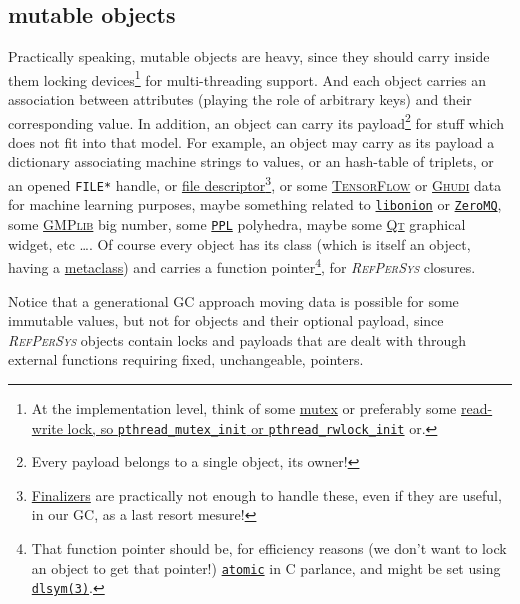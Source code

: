 \documentclass[11pt,a4paper,svgnames]{article}
\newcommand{\RefPerSys}{{\textit{\textsc{RefPerSys}}}}
\begin{document}
\subsection{mutable objects}
\label{subsec:mutable-objects}

Practically speaking, mutable objects are heavy, since they should
carry inside them locking devices\footnote{At the implementation
level, think of some
\href{https://computing.llnl.gov/tutorials/pthreads/\#Mutexes}{mutex}
or preferably some
\href{http://tuxthink.blogspot.com/2013/02/using-read-write-lock-in-pthreads.html}{read-write
  lock, so
  \href{https://pubs.opengroup.org/onlinepubs/7908799/xsh/pthread\_mutex\_init.html}{\texttt{pthread\_mutex\_init}}
  or
  \href{https://pubs.opengroup.org/onlinepubs/7908799/xsh/pthread_rwlock_init.html}{\texttt{pthread\_rwlock\_init}}}
or.} for multi-threading support. And each object carries
an association between attributes (playing the role of arbitrary keys)
and their corresponding value. In addition, an object can carry its
payload\footnote{Every payload belongs to a single object, its owner!}
for stuff which does not fit into that model. For example, an object
may carry as its payload a dictionary associating machine strings to
values, or an hash-table of triplets, or an opened \texttt{FILE*}
handle, or \href{https://en.wikipedia.org/wiki/File\_descriptor}{file
  descriptor}\footnote{\href{https://en.wikipedia.org/wiki/Finalizer}{Finalizers}
are practically not enough to handle these, even if they are useful,
in our GC, as a last resort mesure!}, or some
\href{https://www.tensorflow.org/}{\textsc{TensorFlow}} or
\href{https://gudhi.inria.fr/}{\textsc{Ghudi}} data for machine
learning purposes, maybe something related to
\href{https://github.com/davidmoreno/onion/}{\texttt{libonion}} or
\href{http://zeromq.org}{\texttt{ZeroMQ}}, some
\href{https://gmplib.org/}{\textsc{GMPlib}} big number, some
\href{https://www.bugseng.com/ppl}{\texttt{PPL}} polyhedra, maybe some
\href{http://qt.io/}{\textsc{Qt}} graphical widget, etc \ldots. Of
course every object has its class (which is itself an object, having a
\href{https://en.wikipedia.org/wiki/Metaclass}{metaclass}) and carries
a function pointer\footnote{That function pointer should be, for
efficiency reasons (we don't want to lock an object to get that
pointer!)
\href{https://en.cppreference.com/w/c/atomic}{\texttt{atomic}} in C
parlance, and might be set using
\href{http://man7.org/linux/man-pages/man3/dlsym.3.html}{\texttt{dlsym(3)}}.}, for {\RefPerSys} closures.

Notice that a generational GC approach moving data is possible for
some immutable values, but not for objects and their optional payload,
since {\RefPerSys} objects contain locks and payloads that are dealt
with through external functions requiring fixed, unchangeable, pointers.
\end{document}
